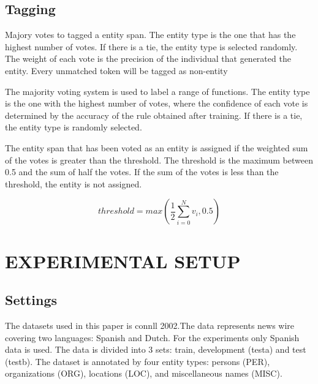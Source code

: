 \documentclass{IEEEtran}
\begin{document}
\subsection{Tagging}


Majory votes to tagged a entity span. The entity type is the one that has the highest number of votes. If there is a tie, the entity type is selected randomly. The weight of each vote is the precision of the individual that generated the entity. Every  unmatched  token  will  be  tagged  as  non-entity

The majority voting system is used to label a range of functions. The entity type is the one with the highest number of votes, where the confidence of each vote is determined by the accuracy of the rule obtained after training. If there is a tie, the entity type is randomly selected.

The entity span that has been voted as an entity is assigned if the weighted sum of the votes is greater than the threshold. The threshold is the maximum between 0.5 and the sum of half the votes. If the sum of the votes is less than the threshold, the entity is not assigned.


\begin{equation}
  \label{threshold_eq}
  threshold = max(\frac{1}{2} \sum_{i=0}^{N} v_i, 0.5)
\end{equation}


\section{EXPERIMENTAL SETUP}

\subsection{Settings}

The datasets used in this paper is connll 2002\cite{tjong-kim-sang-2002-introduction}.The data represents news wire covering two languages: Spanish and Dutch. For the experiments only Spanish data is used. The data is divided into 3 sets: train, development (testa) and test (testb). The dataset is annotated by four entity types: persons (PER), organizations (ORG), locations (LOC), and miscellaneous names (MISC).
\end{document}
